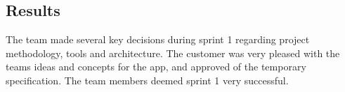 
\subsection{Results}
The team made several key decisions during sprint 1 regarding project methodology, tools and architecture. The customer was very pleased with the teams ideas and concepts for the app, and approved of the temporary specification. The team members deemed sprint 1 very successful.